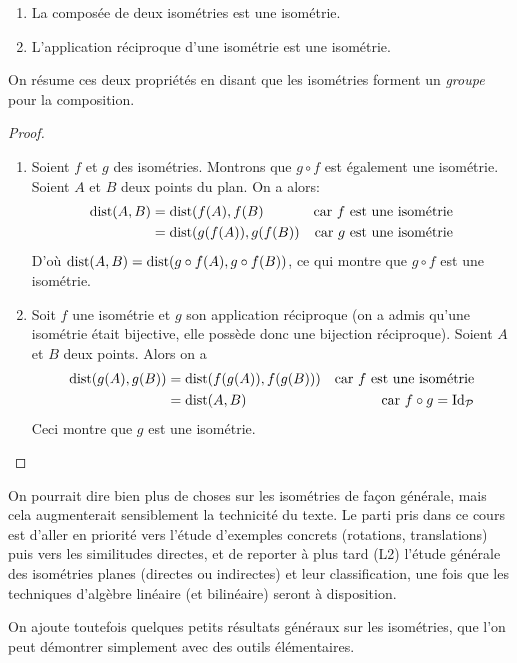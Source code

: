 \begin{proposition}
\begin{enumerate}
\item La composée de deux isométries est une isométrie. 
\item L'application réciproque d'une isométrie est une isométrie.
\end{enumerate}
On résume ces deux propriétés en disant que les \og isométries forment un \emph{groupe} pour la composition\fg.
\end{proposition}
\begin{proof}
\begin{enumerate}
\item Soient $f$ et $g$ des isométries. Montrons que $g\circ f$ est également une isométrie.
Soient $A$ et $B$ deux points du plan. On a alors:
\begin{align*}
\operatorname{dist}(A,B)
&= \operatorname{dist}(f(A),f(B) & \text{car $f$ est une isométrie}\\
&= \operatorname{dist}(g(f(A)),g(f(B)) & \text{car $g$ est une isométrie}\\
\end{align*}
D'où $\operatorname{dist}(A,B) = \operatorname{dist}(g\circ f(A),g\circ f(B))$, ce qui montre que $g\circ f$ est une isométrie.
\item Soit $f$ une isométrie et $g$ son application réciproque (on a admis qu'une isométrie était bijective, elle possède donc une bijection réciproque). Soient $A$ et $B$ deux points. Alors  on a 
\begin{align*}
\operatorname{dist}(g(A),g(B))
&= \operatorname{dist}(f(g(A)),f(g(B))) & \text{car $f$ est une isométrie}\\
&= \operatorname{dist}(A,B)& \text{car $f\circ g=\operatorname{Id}_{\mathcal P}$}\\
\end{align*}
Ceci montre que $g$ est une isométrie.
\end{enumerate}
\end{proof}

On pourrait dire bien plus de choses sur les isométries de façon générale, mais cela augmenterait sensiblement la technicité du texte. Le parti pris dans ce cours est d'aller en priorité vers l'étude d'exemples concrets (rotations, translations) puis vers les similitudes directes, et de reporter à plus tard (L2) l'étude générale des isométries planes (directes ou indirectes) et  leur classification, une fois que les techniques d'algèbre linéaire (et bilinéaire) seront à disposition.

On ajoute toutefois quelques petits résultats généraux sur les isométries, que l'on peut démontrer simplement avec des outils élémentaires.

